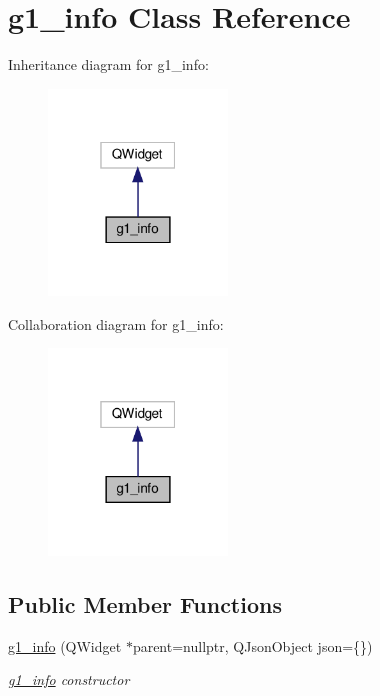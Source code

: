 \hypertarget{classg1__info}{}\section{g1\+\_\+info Class Reference}
\label{classg1__info}


Inheritance diagram for g1\+\_\+info\+:
\nopagebreak
\begin{figure}[H]
\begin{center}
\leavevmode
\includegraphics[width=135pt]{classg1__info__inherit__graph}
\end{center}
\end{figure}


Collaboration diagram for g1\+\_\+info\+:
\nopagebreak
\begin{figure}[H]
\begin{center}
\leavevmode
\includegraphics[width=135pt]{classg1__info__coll__graph}
\end{center}
\end{figure}
\subsection*{Public Member Functions}
\begin{DoxyCompactItemize}
\item 
\hyperlink{classg1__info_ae492d616a5f3dd0dc3177fdae814288d}{g1\+\_\+info} (Q\+Widget $\ast$parent=nullptr, Q\+Json\+Object json=\{\})
\begin{DoxyCompactList}\small\item\em \hyperlink{classg1__info}{g1\+\_\+info} constructor \end{DoxyCompactList}\end{DoxyCompactItemize}


